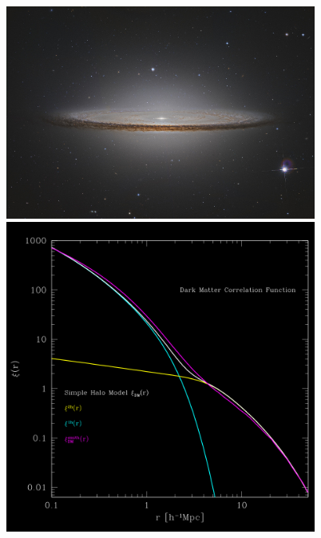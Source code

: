 \documentclass{beamer}
\begin{document}
{\begin{columns}
\begin{column}{0.5\textwidth}
        \end{column}
        \begin{column}{0.5\textwidth}
            \begin{center}
                \includegraphics[width=0.8\textwidth]{M104b_peris2048_scale_small.jpg}
                \includegraphics[width=0.8\textwidth]{zentner-halo-model-inv.png}
            \end{center}
        \end{column}

    \end{columns}


}
\end{document}
